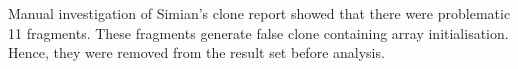 \documentclass{sig-alternate-05-2015}
\begin{document}
\begin{table}[H]
\begin{tabular}{l|r|r|r|r}
	\end{tabular}
\end{table}

Manual investigation of Simian's clone report showed that there were problematic 11 fragments. These fragments generate false clone containing array initialisation. Hence, they were removed from the result set before analysis.
\end{document}

